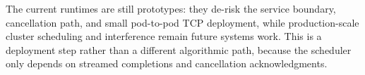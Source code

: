 The current runtimes are still prototypes: they de-risk the service boundary,
cancellation path, and small pod-to-pod TCP deployment, while production-scale
cluster scheduling and interference remain future systems work.  This is a
deployment step rather than a different algorithmic path, because the scheduler
only depends on streamed completions and cancellation acknowledgments.
